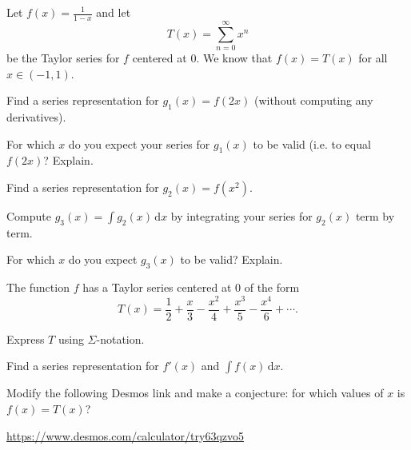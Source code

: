 \documentclass{workbook}
\begin{document}
\begin{slide}
	\question
	Let $f(x)=\frac{1}{1-x}$ and let 
	\[
		T(x)=\sum_{n=0}^\infty x^n
	\]
	be the Taylor series for $f$ centered at $0$. We know that
	$f(x)=T(x)$ for all $x\in (-1,1)$.

	\begin{parts}
		\item Find a series representation for $g_1(x)=f(2x)$ (without 
		computing any derivatives).
		\item For which $x$ do you expect your series for $g_1(x)$ to be valid (i.e. to equal
		$f(2x)$? Explain.
		\item Find a series representation for $g_2(x)=f(x^2)$.
		\item Compute $g_3(x)=\displaystyle \int g_2(x)\,\mathrm d x$ by integrating your series for $g_2(x)$ term by term. 
		\item For which $x$ do you expect $g_3(x)$ to be valid? Explain.
	\end{parts}
\end{slide}

\begin{slide}
	\question
	The function $f$ has a Taylor series centered at $0$ of the form
	\[
		T(x)=\frac{1}{2}+\frac{x}{3}-\frac{x^2}{4}+\frac{x^3}{5}-\frac{x^4}{6}+\cdots.
	\]

	\begin{parts}
		\item Express $T$ using $\Sigma$-notation.
		\item Find a series representation for $f'(x)$ and $\displaystyle\int f(x)\,\mathrm d x$.
		\item Modify the following Desmos link and make a conjecture: for
		which values of $x$ is $f(x)=T(x)$?

		\url{https://www.desmos.com/calculator/try63qzvo5}
	\end{parts}
\end{slide}
\end{document}
